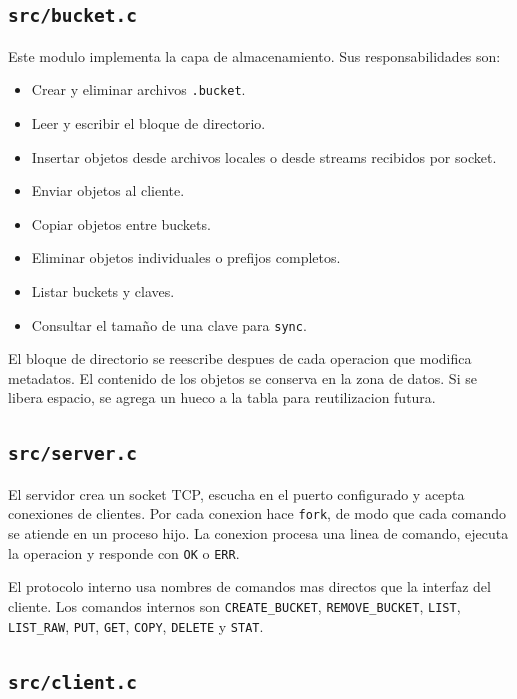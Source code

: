 \documentclass[12pt,letterpaper]{article}
\begin{document}
\subsection{\texttt{src/bucket.c}}

Este modulo implementa la capa de almacenamiento. Sus responsabilidades son:
\begin{itemize}
    \item Crear y eliminar archivos \texttt{.bucket}.
    \item Leer y escribir el bloque de directorio.
    \item Insertar objetos desde archivos locales o desde streams recibidos por socket.
    \item Enviar objetos al cliente.
    \item Copiar objetos entre buckets.
    \item Eliminar objetos individuales o prefijos completos.
    \item Listar buckets y claves.
    \item Consultar el tama\~{n}o de una clave para \texttt{sync}.
\end{itemize}

El bloque de directorio se reescribe despues de cada operacion que modifica metadatos.
El contenido de los objetos se conserva en la zona de datos. Si se libera espacio, se
agrega un hueco a la tabla para reutilizacion futura.

\subsection{\texttt{src/server.c}}

El servidor crea un socket TCP, escucha en el puerto configurado y acepta conexiones
de clientes. Por cada conexion hace \texttt{fork}, de modo que cada comando se atiende
en un proceso hijo. La conexion procesa una linea de comando, ejecuta la operacion y
responde con \texttt{OK} o \texttt{ERR}.

El protocolo interno usa nombres de comandos mas directos que la interfaz del cliente.
Los comandos internos son \texttt{CREATE\_BUCKET}, \texttt{REMOVE\_BUCKET},
\texttt{LIST}, \texttt{LIST\_RAW}, \texttt{PUT}, \texttt{GET}, \texttt{COPY},
\texttt{DELETE} y \texttt{STAT}.

\subsection{\texttt{src/client.c}}
\end{document}
